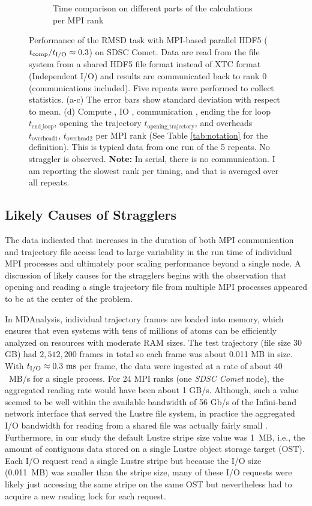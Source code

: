 \begin{figure}[ht!]
\begin{subfigure} {.5\textwidth}
  \caption{Time comparison on different parts of the calculations per MPI rank}
  \label{fig:MPIranks-hdf5}
\end{subfigure}
%
\caption{Performance of the RMSD task with MPI-based parallel HDF5 (${t}_{\text{comp}}/{t}_{\text{I/O}} \approx 0.3$) on SDSC Comet.
Data are read from the file system from a shared HDF5 file format instead of XTC format (Independent I/O) and results are communicated back to rank 0 (communications included). 
Five repeats were performed to collect statistics. (a-c) The error bars show standard deviation with respect to mean. (d) Compute \tcomp, IO \tIO, communication \tcomm, ending the for loop $t_{\text{end\_loop}}$,
  opening the trajectory $t_{\text{opening\_trajectory}}$, and overheads $t_{\text{overhead1}}$, $t_{\text{overhead2}}$ per MPI rank (See Table \ref{tab:notation} for the definition).
  This is typical data from one run of the 5 repeats. No straggler is observed. \textbf{Note:} In serial, there is no communication. I am reporting the slowest rank per timing, and that is averaged over all repeats.}
\label{fig:MPIwithIO-hdf5}
\end{figure}


\subsection{Likely Causes of Stragglers}
\label{sec:likelycauses}
The data indicated that increases in the duration of both MPI communication and trajectory file access lead to large variability in the run time of individual MPI processes and ultimately poor scaling performance beyond a single node.
A discussion of likely causes for the stragglers begins with the observation that opening and reading a single trajectory file from multiple MPI processes appeared to be at the center of the problem. 

In MDAnalysis, individual trajectory frames are loaded into memory, which ensures that even systems with tens of millions of atoms can be efficiently analyzed on resources with moderate RAM sizes.
The test trajectory (file size 30 GB) had $2,512,200$ frames in total so each frame was about 0.011 MB in size.
With ${t}_{\text{I/O}} \approx 0.3~\text{ms}$ per frame, the data were ingested at a rate of about $40$~MB/s for a single process.
For 24 MPI ranks (one \emph{SDSC Comet} node), the aggregated reading rate would have been about 1 GB/s.
Although, such a value seemed to be well within the available bandwidth of 56 Gb/s of the Infini-band network interface that served the Lustre file system, in practice the aggregated I/O bandwidth for reading from a shared file was actually fairly small \cite{ATPESC2016}.
Furthermore, in our study the default Lustre stripe size value was 1~MB, i.e., the amount of contiguous data stored on a single Lustre object storage target (OST).
Each I/O request read a single Lustre stripe but because the I/O size (0.011~MB) was smaller than the stripe size, many of these I/O requests were likely just accessing the same stripe on the same OST but nevertheless had to acquire a new reading lock for each request.

